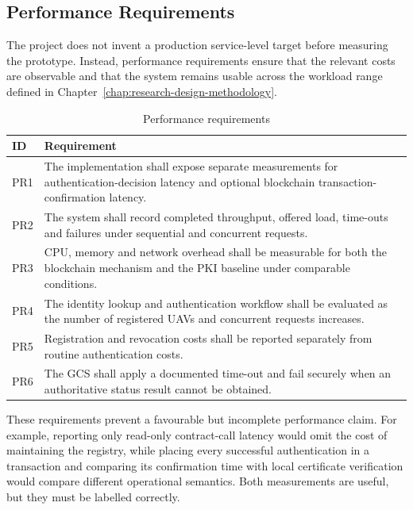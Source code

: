\subsection{Performance Requirements}
\label{subsec:performance-requirements}

The project does not invent a production service-level target before measuring the prototype. Instead, performance requirements ensure that the relevant costs are observable and that the system remains usable across the workload range defined in Chapter~\ref{chap:research-design-methodology}.

\begin{table}[htbp]
    \centering
    \caption{Performance requirements}
    \label{tab:performance-requirements}
    \begin{tabular}{|p{}|p{}|}
        \hline
        \textbf{ID} & \textbf{Requirement} \\
        \hline
        PR1 & The implementation shall expose separate measurements for authentication-decision latency and optional blockchain transaction-confirmation latency. \\
        \hline
        PR2 & The system shall record completed throughput, offered load, time-outs and failures under sequential and concurrent requests. \\
        \hline
        PR3 & CPU, memory and network overhead shall be measurable for both the blockchain mechanism and the PKI baseline under comparable conditions. \\
        \hline
        PR4 & The identity lookup and authentication workflow shall be evaluated as the number of registered UAVs and concurrent requests increases. \\
        \hline
        PR5 & Registration and revocation costs shall be reported separately from routine authentication costs. \\
        \hline
        PR6 & The GCS shall apply a documented time-out and fail securely when an authoritative status result cannot be obtained. \\
        \hline
    \end{tabular}
\end{table}

These requirements prevent a favourable but incomplete performance claim. For example, reporting only read-only contract-call latency would omit the cost of maintaining the registry, while placing every successful authentication in a transaction and comparing its confirmation time with local certificate verification would compare different operational semantics. Both measurements are useful, but they must be labelled correctly.

